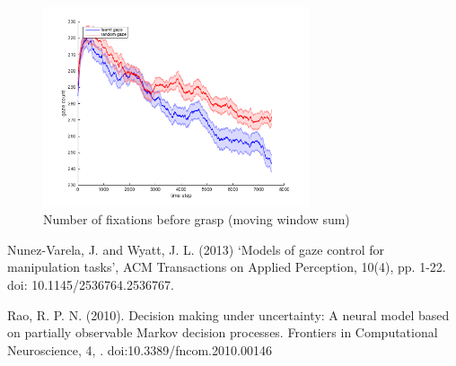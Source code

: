 \documentclass[11]{article}
\begin{document}
\begin{figure}[!h]
	\centering
	\includegraphics[width=0.7\textwidth]{gazeCount.png}
	\caption{Number of fixations before grasp (moving window sum)}
	\label{fig:gazeCount}
\end{figure}

\pagebreak

\begin{thebibliography}{9}
Nunez-Varela, J. and Wyatt, J. L. (2013) ‘Models of gaze control for manipulation tasks’, ACM Transactions on Applied Perception, 10(4), pp. 1-22. doi: 10.1145/2536764.2536767.

Rao, R. P. N. (2010). Decision making under uncertainty: A neural model based on partially observable Markov decision processes. Frontiers in Computational Neuroscience, 4, . doi:10.3389/fncom.2010.00146

\end{thebibliography}
\end{document}
